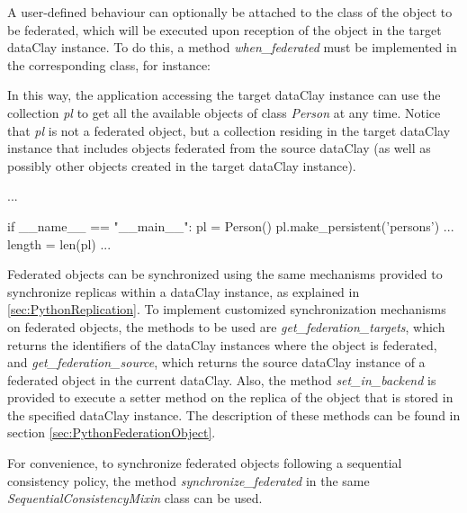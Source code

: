 A user-defined behaviour can optionally be attached to the class of the object to be federated, which will be executed upon reception of the object in the target dataClay instance. To do this, a method \textit{when\_federated} must be implemented in the corresponding class, for instance:

\begin{tBox}
\begin{python}
class Person(DataClayObject):
     ...

     @dclayMethod()
     def when_federated():
     pl = PersonList.get_by_alias('persons')
     pl.add(self);
  }
}
\end{python}
\end{tBox}

In this way, the application accessing the target dataClay instance can use the collection \textit{pl} to get all the available objects of class \textit{Person} at any time. Notice that \textit{pl} is not a federated object, but a collection residing in the target dataClay instance that includes objects federated from the source dataClay (as well as possibly other objects created in the target dataClay instance).

\begin{tBox}
\begin{python}

...

  if __name__ == "__main__":
    pl = Person()
    pl.make_persistent('persons')
    ...
    length = len(pl)
    ...
    
\end{python}
\end{tBox}
 
Federated objects can be synchronized using the same mechanisms provided to synchronize replicas within a dataClay instance, as explained in \ref{sec:PythonReplication}. To implement customized synchronization mechanisms on federated objects, the methods to be used are \textit{get\_federation\_targets}, which returns the identifiers of the dataClay instances where the object is federated, and \textit{get\_federation\_source}, which returns the source dataClay instance of a federated object in the current dataClay. Also, the method \textit{set\_in\_backend} is provided to execute a setter method on the replica of the object that is stored in the specified dataClay instance. The description of these methods can be found in section \ref{sec:PythonFederationObject}.

For convenience, to synchronize federated objects following a sequential consistency policy, the method \textit{synchronize\_federated} in the same \textit{SequentialConsistencyMixin} class can be used.

